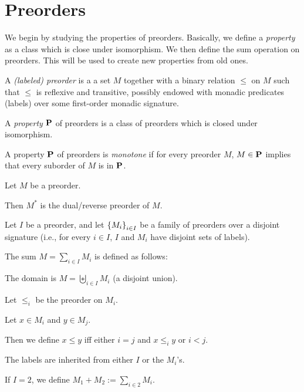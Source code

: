 \section{Preorders}

We begin by studying the properties of preorders.
Basically, we define a \emph{property} as a class which is
close under isomorphism. We then define
the sum operation on preorders. This will be used
to create new properties from old ones.

\begin{definitions} [Preorder]
  A \emph{(labeled) preorder} is a a set $M$
  together with a binary relation $\le$ on $M$ such that
  $\le$ is reflexive and transitive,
  possibly endowed with monadic predicates (labels)
  over some first-order monadic signature.
\end{definitions}

\begin{definition}
  A \emph{property} $\mathbf{P}$ of preorders is a class of preorders which
  is closed under isomorphism.
\end{definition}

\begin{definition}
  A property $\mathbf{P}$ of preorders is \emph{monotone} if for every preorder $M$,
  $M \in \mathbf{P}$ implies that every suborder of $M$ is in $\mathbf{P}$.
\end{definition}

\begin{definition}
  Let $M$ be a preorder.

  Then $M^\ast$ is the dual/reverse preorder of $M$.
\end{definition}

\begin{definition}
  Let $I$ be a preorder, and let $\left\{ {M_i} \right\}_{i \in I}$ be a family of preorders over
  a disjoint signature (i.e., for every $i \in I$, $I$ and $M_i$ have disjoint sets of labels).

  The sum $M = \sum_{i \in I} M_i$ is defined as follows:

  The domain is $M = \biguplus_{i \in I} M_i$ (a disjoint union).

  Let $\le_i$ be the preorder on $M_i$.

  Let $x \in M_i$ and $y \in M_j$.

  Then we define $x \le y$ iff either
  $i = j$ and $x \le_i y$ or $i < j$.

  The labels are inherited from either $I$ or the $M_i$'s.

  If $I = 2$, we define $M_1 + M_2 := \sum_{i \in 2} M_i$.
\end{definition}

